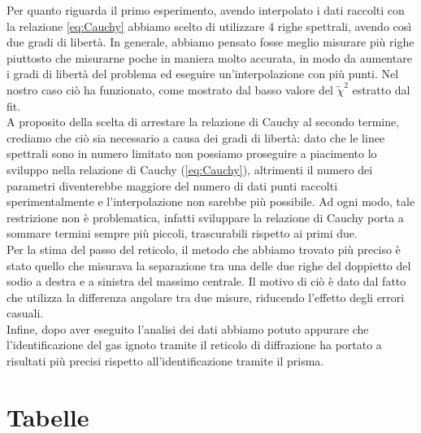 \documentclass[letterpaper,12pt]{article}
\begin{document}
Per quanto riguarda il primo esperimento, avendo interpolato i dati raccolti con la relazione \eqref{eq:Cauchy} abbiamo scelto di utilizzare 
4 righe spettrali, avendo così due gradi di libertà. In generale, abbiamo pensato fosse meglio misurare più righe 
piuttosto che misurarne poche in maniera molto accurata, in modo da aumentare i gradi di libertà del problema ed 
eseguire un'interpolazione con più punti. Nel nostro caso ciò ha funzionato, come mostrato dal basso valore
del $\tilde{\chi}^2$ estratto dal fit.\\
A proposito della scelta di arrestare la relazione di Cauchy al secondo termine, crediamo che ciò sia necessario
a causa dei gradi di libertà: dato che le linee spettrali sono in numero limitato non possiamo proseguire a piacimento
lo sviluppo nella relazione di Cauchy (\ref{eq:Cauchy}), altrimenti il numero dei parametri diventerebbe maggiore
del numero di dati punti raccolti sperimentalmente e l'interpolazione non sarebbe più possibile. Ad ogni modo, tale 
restrizione non è problematica, infatti sviluppare la relazione di Cauchy porta a sommare termini sempre più piccoli,
trascurabili rispetto ai primi due. \\
Per la stima del passo del reticolo, il metodo che abbiamo trovato più preciso è stato quello 
che misurava la separazione tra una delle due righe del doppietto del sodio a destra e a sinistra del massimo centrale.
Il motivo di ciò è dato dal fatto che utilizza la differenza angolare tra due misure, riducendo 
l'effetto degli errori casuali.\\
Infine, dopo aver eseguito l'analisi dei dati abbiamo potuto appurare che l'identificazione del gas ignoto tramite il reticolo
di diffrazione ha portato a risultati più precisi rispetto all'identificazione tramite il prisma.

\newpage
\section{Tabelle}
\end{document}
